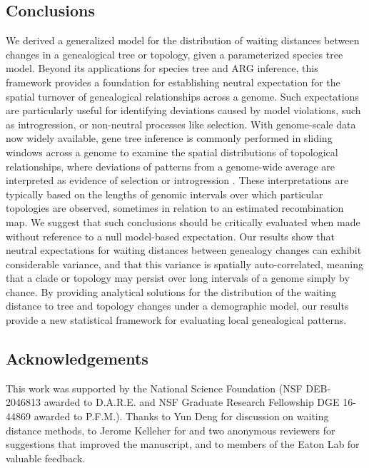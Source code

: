 \documentclass[11pt]{article}
\begin{document}
\subsection{Conclusions}
We derived a generalized model for the distribution of waiting
distances between changes in a genealogical tree or topology, 
given a parameterized species tree model.
% 
Beyond its applications for species tree and ARG inference, 
this framework provides a foundation for establishing neutral 
expectation for the spatial turnover of genealogical 
relationships across a genome.
% 
Such expectations are particularly useful for identifying
deviations caused by model violations, such as introgression,
or non-neutral processes like selection.
% 
With genome-scale data now widely available, gene tree inference
is commonly performed in sliding windows across a genome to examine
the spatial distributions of topological relationships, where
deviations of patterns from a genome-wide average are interpreted
as evidence of selection or introgression
\citep{martin_exploring_2017,zhang2016genome,li2019recombination}.
% 
These interpretations are typically based on the lengths of genomic
intervals over which particular topologies are observed, 
sometimes in relation to an estimated recombination map.
% 
We suggest that such conclusions should be critically evaluated
when made without reference to a null model-based expectation. 
% 
Our results show that neutral expectations for waiting distances between 
genealogy changes can exhibit considerable variance, and that this 
variance is spatially auto-correlated, meaning that a clade or topology
may persist over long intervals of a genome simply by chance.
% 
By providing analytical solutions for the distribution of the waiting
distance to tree and topology changes under a demographic model, 
our results provide a new statistical framework for evaluating 
local genealogical patterns.



\subsection{Acknowledgements}
This work was supported by the National Science Foundation 
(NSF DEB-2046813 awarded to D.A.R.E. and NSF Graduate Research Fellowship 
DGE 16-44869 awarded to P.F.M.). Thanks to Yun Deng for discussion
on waiting distance methods, to Jerome Kelleher for and two anonymous 
reviewers for suggestions that improved the manuscript, and to members of 
the Eaton Lab for valuable feedback.
\end{document}
